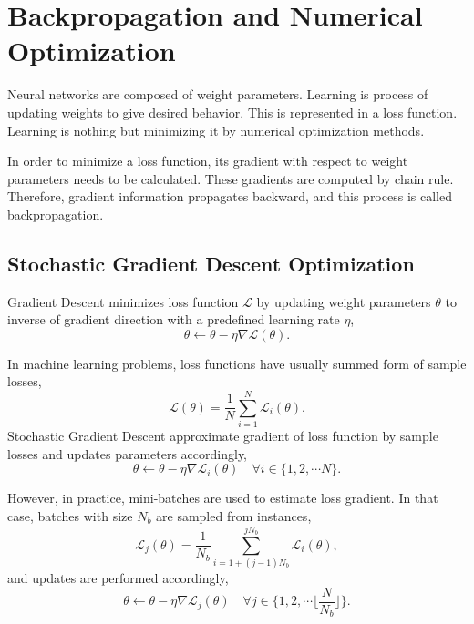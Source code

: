 \section{Backpropagation and Numerical Optimization}
\label{sec:backprop}

Neural networks are composed of weight parameters. 
Learning is process of updating weights to give desired behavior. 
This is represented in a loss function. Learning is nothing but minimizing it by numerical optimization methods. 

In order to minimize a loss function, its gradient with respect to weight parameters needs to be calculated. 
These gradients are computed by chain rule. 
Therefore, gradient information propagates backward, and this process is called backpropagation. 

\subsection{Stochastic Gradient Descent Optimization}

Gradient Descent minimizes loss function $\mathcal{L}$ by updating weight parameters $\theta$ to inverse of gradient direction with a predefined learning rate $\eta$, 
\begin{equation}
\label{eq: grad_desc}
\theta \leftarrow \theta - \eta \nabla \mathcal{L}(\theta).
\end{equation}

In machine learning problems, loss functions have usually summed form of sample losses, 
\begin{equation}
\label{eqn:summed_loss}
\mathcal{L}(\theta) = \frac{1}{N} \sum_{i=1}^{N} \mathcal{L}_i(\theta).
\end{equation}
Stochastic Gradient Descent approximate gradient of loss function by sample losses and updates parameters accordingly,
\begin{equation}
\label{eqn:stch_grad_desc}
\theta \leftarrow \theta - \eta \nabla \mathcal{L}_i(\theta) \quad \forall i \in \{1,2, \cdots N\}.
\end{equation}

However, in practice, mini-batches are used to estimate loss gradient. 
In that case, batches with size $N_b$ are sampled from instances, \begin{equation}
\label{eqn:mb_summed_loss}
\mathcal{L}_j(\theta) = \frac{1}{N_b} \sum_{i=1 + (j-1) N_b}^{j N_b} \mathcal{L}_i(\theta),
\end{equation}
and updates are performed accordingly,
\begin{equation}
\label{eqn:mb_grad_desc}
\theta \leftarrow \theta - \eta  \nabla \mathcal{L}_j(\theta) \quad \forall j \in \{1,2, \cdots \Big\lfloor\frac{N}{N_b}\Big\rfloor\}.
\end{equation}

